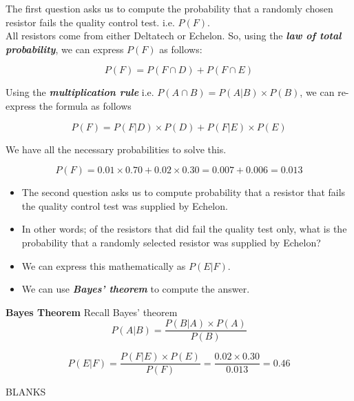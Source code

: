 \documentclass[a4paper,12pt]{article}
\begin{document}
\noindent The first question asks us to compute the probability that a randomly chosen resistor fails the quality control test. i.e. $P(F)$.\\
\bigskip
\noindent All resistors come from either Deltatech or Echelon. So, using the \textbf{\emph{law of total probability}}, we can express $P(F)$ as follows:

\[ P(F)  = P(F \cap D) + P(F \cap E) \]


\noindent Using the \textbf{\emph{multiplication rule}}  i.e. $P(A \cap B) = P(A|B) \times P(B)$, we can re-express the formula as follows

\[ P(F)  = P(F|D) \times P(D) + P(F|E) \times P(E) \]

\noindent We have all the necessary probabilities to solve this.

\[ P(F)  = 0.01 \times 0.70 + 0.02 \times 0.30   = 0.007 + 0.006  = 0.013\]



\medskip

\begin{itemize}
\item
The second question asks us to compute probability that a resistor that fails the quality control test was supplied by Echelon.
\item In other words; of the resistors that did fail the quality test only, what is the probability that a randomly selected resistor was supplied by Echelon?
\item We can express this mathematically as $P(E|F)$.
\item We can use \textbf{\emph{Bayes' theorem}} to compute the answer.
\end{itemize}



\noindent \textbf{Bayes Theorem}
Recall Bayes' theorem
\[ P(A|B) = \frac{P(B|A)\times P(A)}{P(B)} \]
\bigskip

\[ P(E|F) = \frac{P(F|E)\times P(E)}{P(F)}  =  \frac{0.02 \times 0.30}{0.013} = 0.46\]

\newpage
BLANKS
\end{document}
